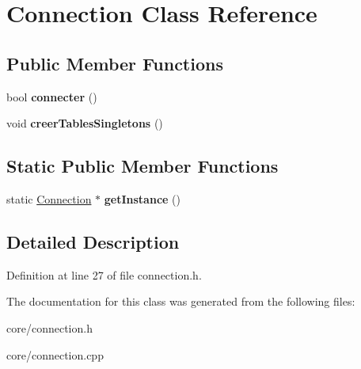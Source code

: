\hypertarget{class_connection}{
\section{Connection Class Reference}
\label{class_connection}
}
\subsection*{Public Member Functions}
\begin{DoxyCompactItemize}
\item 
\hypertarget{class_connection_aa7f45a931977be941e3f02633e458b32}{
bool {\bfseries connecter} ()}
\label{class_connection_aa7f45a931977be941e3f02633e458b32}

\item 
\hypertarget{class_connection_a6f462b425927fa14e6e5fb5976d1a428}{
void {\bfseries creerTablesSingletons} ()}
\label{class_connection_a6f462b425927fa14e6e5fb5976d1a428}

\end{DoxyCompactItemize}
\subsection*{Static Public Member Functions}
\begin{DoxyCompactItemize}
\item 
\hypertarget{class_connection_a3146d676185877bb2931fc3f8b96c5e4}{
static \hyperlink{class_connection}{Connection} $\ast$ {\bfseries getInstance} ()}
\label{class_connection_a3146d676185877bb2931fc3f8b96c5e4}

\end{DoxyCompactItemize}


\subsection{Detailed Description}


Definition at line 27 of file connection.h.



The documentation for this class was generated from the following files:\begin{DoxyCompactItemize}
\item 
core/connection.h\item 
core/connection.cpp\end{DoxyCompactItemize}
